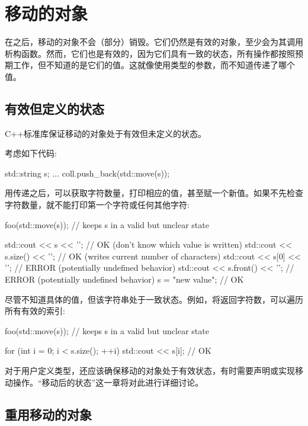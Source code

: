 \section{移动的对象}
在之后，移动的对象不会（部分）销毁。它们仍然是有效的对象，至少会为其调用析构函数。然而，它们也是有效的，因为它们具有一致的状态，所有操作都按照预期工作，但不知道的是它们的值。这就像使用类型的参数，而不知道传递了哪个值。

\subsection{有效但定义的状态}

C++标准库保证移动的对象处于有效但未定义的状态。

考虑如下代码:

\begin{cppcode}
std::string s;
...
coll.push_back(std::move(s));
\end{cppcode}

用传递之后，可以获取字符数量，打印相应的值，甚至赋一个新值。如果不先检查字符数量，就不能打印第一个字符或任何其他字符:

\begin{cppcode}
foo(std::move(s)); // keeps s in a valid but unclear state

std::cout << s << '\n'; // OK (don’t know which value is written)
std::cout << s.size() << '\n'; // OK (writes current number of characters)
std::cout << s[0] << '\n'; // ERROR (potentially undefined behavior)
std::cout << s.front() << '\n'; // ERROR (potentially undefined behavior)
s = "new value"; // OK
\end{cppcode}

尽管不知道具体的值，但该字符串处于一致状态。例如，将返回字符数，可以遍历所有有效的索引:

\begin{cppcode}
foo(std::move(s)); // keeps s in a valid but unclear state

for (int i = 0; i < s.size(); ++i) {
	std::cout << s[i]; // OK
}
\end{cppcode}

对于用户定义类型，还应该确保移动的对象处于有效状态，有时需要声明或实现移动操作。“移动后的状态”这一章将对此进行详细讨论。

\subsection{重用移动的对象}


